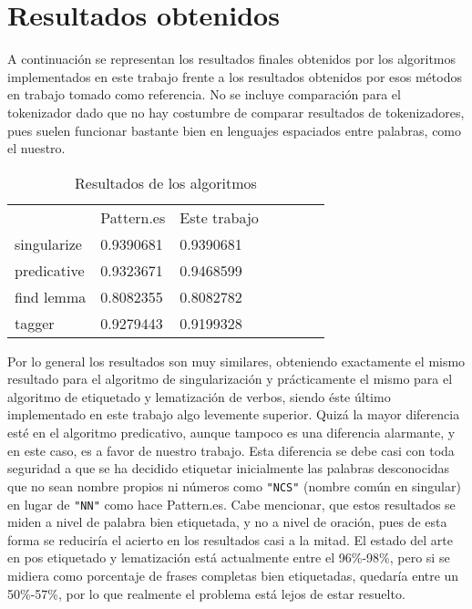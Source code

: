 \section{Resultados obtenidos}
A continuación se representan los resultados finales obtenidos por los algoritmos implementados en este trabajo frente a los resultados obtenidos por esos métodos en trabajo tomado como referencia. No se incluye comparación para el tokenizador dado que no hay costumbre de comparar resultados de tokenizadores, pues suelen funcionar bastante bien en lenguajes espaciados entre palabras, como el nuestro. 
\begin{table}[H]
\centering
\caption*{Resultados de los algoritmos}
\label{my-label}
\begin{tabular}{l|l|l|llll}
\cline{2-3}
                       &    \textsf{Pattern.es}               &   \textsf{Este trabajo}                &  \\ \cline{1-3}
\multicolumn{1}{|l|}{singularize} & 0.9390681  & 0.9390681     &   \\ \cline{1-1}
\multicolumn{1}{|l|}{predicative} & 0.9323671  & 0.9468599     &    \\ \cline{1-1}
\multicolumn{1}{|l|}{find lemma}  & 0.8082355  & 0.8082782     &   \\ \cline{1-1}
\multicolumn{1}{|l|}{tagger}      & 0.9279443  & 0.9199328    &   \\ \cline{1-3}
\end{tabular}
\end{table}

Por lo general los resultados son muy similares, obteniendo exactamente el mismo resultado para el algoritmo de singularización y prácticamente el mismo para el algoritmo de etiquetado y lematización de verbos, siendo éste último implementado en este trabajo algo levemente superior. \newline
Quizá la mayor diferencia esté en el algoritmo predicativo, aunque tampoco es una diferencia alarmante, y en este caso, es a favor de nuestro trabajo. Esta diferencia se debe casi con toda seguridad a que se ha decidido etiquetar inicialmente las palabras desconocidas que no sean nombre propios ni números como \texttt{"NCS"} (nombre común en singular) en lugar de \texttt{"NN"} como hace \textsf{Pattern.es}. Cabe mencionar, que estos resultados se miden a nivel de palabra bien etiquetada, y no a nivel de oración, pues de esta forma se reduciría el acierto en los resultados casi a la mitad. El estado del arte en pos etiquetado y lematización está actualmente entre el 96\%-98\%, pero si se midiera como porcentaje de frases completas bien etiquetadas, quedaría entre un 50\%-57\%, por lo que realmente el problema está lejos de estar resuelto. 

